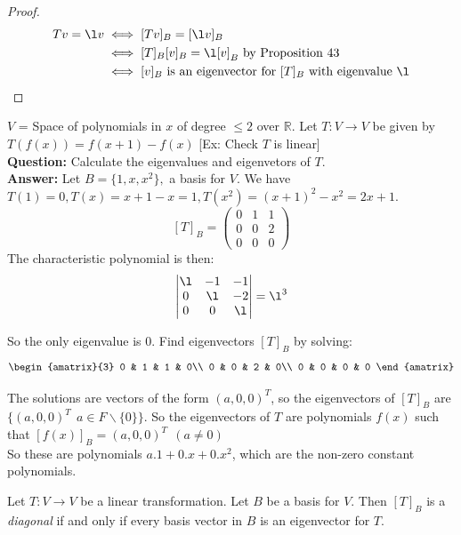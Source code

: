 \documentclass[twoside]{scrartcl}
\begin{document}
\begin{proof}
\[
\begin{aligned}
Tv = \l v & \iff [Tv]_B = [\l v]_B\\
& \iff [T]_B[v]_B = \l[v]_B \text{ by Proposition 43}\\
& \iff [v]_B \text{ is an eigenvector for } [T]_B \text{ with eigenvalue } \l
\end{aligned}\]
\end{proof}


\begin{example} $V$ = Space of polynomials in $x$ of degree $\leq 2$ over $\mathbb{R}$. Let $T: V \to V$ be given by $T(f(x)) = f(x+1) - f(x)$ [Ex: Check $T$ is linear]\\

\textbf{Question:} Calculate the eigenvalues and eigenvetors of $T$.\\

\textbf{Answer:} Let $B = \{1,x,x^2\},$ a basis for $V$. We have $T(1) = 0, T(x) = x+1 -x = 1, T(x^2) = (x+1)^2 - x^2 = 2x+1$.
\[[T]_B = \begin{pmatrix}
0 & 1 & 1 \\ 0 & 0 & 2 \\ 0 & 0 & 0
\end{pmatrix}
\] The characteristic polynomial is then:
\[
\begin{vmatrix}
\l & -1 & -1 \\ 0 & \l & -2 \\ 0 & 0 & \l
\end{vmatrix} = \l^3 \]

So the only eigenvalue is 0. Find eigenvectors $[T]_B$ by solving: 
\[\begin{amatrix}{3}
0 & 1 & 1 & 0\\
0 & 0 & 2 & 0\\
0 & 0 & 0 & 0
\end{amatrix}
\]

The solutions are vectors of the form $(a,0,0)^T$, so the eigenvectors of $[T]_B$ are $\{(a,0,0)^T ~~ a \in F\backslash \{0\} \}$. So the eigenvectors of $T$ are polynomials $f(x)$ such that $[f(x)]_B =  (a,0,0)^T ~~(a \neq 0)$\\

So these are polynomials $a.1 + 0.x + 0.x^2$, which are the non-zero constant polynomials.\end{example}

\begin{proposition} Let $T: V \to V$ be a linear transformation. Let $B$ be a basis for $V$. Then $[T]_B$ is a \emph{diagonal} if and only if every basis vector in $B$ is an eigenvector for $T$.	
\end{proposition}
\end{document}
